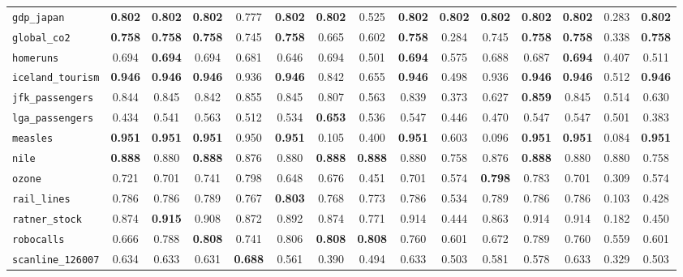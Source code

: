 \begin{tabular}{lcccccccccccccc}
\verb+gdp_japan+ & \textbf{0.802} & \textbf{0.802} & \textbf{0.802} & 0.777 & \textbf{0.802} & \textbf{0.802} & 0.525 & \textbf{0.802} & \textbf{0.802} & \textbf{0.802} & \textbf{0.802} & \textbf{0.802} & 0.283 & \textbf{0.802}\\
\verb+global_co2+ & \textbf{0.758} & \textbf{0.758} & \textbf{0.758} & 0.745 & \textbf{0.758} & 0.665 & 0.602 & \textbf{0.758} & 0.284 & 0.745 & \textbf{0.758} & \textbf{0.758} & 0.338 & \textbf{0.758}\\
\verb+homeruns+ & 0.694 & \textbf{0.694} & 0.694 & 0.681 & 0.646 & 0.694 & 0.501 & \textbf{0.694} & 0.575 & 0.688 & 0.687 & \textbf{0.694} & 0.407 & 0.511\\
\verb+iceland_tourism+ & \textbf{0.946} & \textbf{0.946} & \textbf{0.946} & 0.936 & \textbf{0.946} & 0.842 & 0.655 & \textbf{0.946} & 0.498 & 0.936 & \textbf{0.946} & \textbf{0.946} & 0.512 & \textbf{0.946}\\
\verb+jfk_passengers+ & 0.844 & 0.845 & 0.842 & 0.855 & 0.845 & 0.807 & 0.563 & 0.839 & 0.373 & 0.627 & \textbf{0.859} & 0.845 & 0.514 & 0.630\\
\verb+lga_passengers+ & 0.434 & 0.541 & 0.563 & 0.512 & 0.534 & \textbf{0.653} & 0.536 & 0.547 & 0.446 & 0.470 & 0.547 & 0.547 & 0.501 & 0.383\\
\verb+measles+ & \textbf{0.951} & \textbf{0.951} & \textbf{0.951} & 0.950 & \textbf{0.951} & 0.105 & 0.400 & \textbf{0.951} & 0.603 & 0.096 & \textbf{0.951} & \textbf{0.951} & 0.084 & \textbf{0.951}\\
\verb+nile+ & \textbf{0.888} & 0.880 & \textbf{0.888} & 0.876 & 0.880 & \textbf{0.888} & \textbf{0.888} & 0.880 & 0.758 & 0.876 & \textbf{0.888} & 0.880 & 0.880 & 0.758\\
\verb+ozone+ & 0.721 & 0.701 & 0.741 & 0.798 & 0.648 & 0.676 & 0.451 & 0.701 & 0.574 & \textbf{0.798} & 0.783 & 0.701 & 0.309 & 0.574\\
\verb+rail_lines+ & 0.786 & 0.786 & 0.789 & 0.767 & \textbf{0.803} & 0.768 & 0.773 & 0.786 & 0.534 & 0.789 & 0.786 & 0.786 & 0.103 & 0.428\\
\verb+ratner_stock+ & 0.874 & \textbf{0.915} & 0.908 & 0.872 & 0.892 & 0.874 & 0.771 & 0.914 & 0.444 & 0.863 & 0.914 & 0.914 & 0.182 & 0.450\\
\verb+robocalls+ & 0.666 & 0.788 & \textbf{0.808} & 0.741 & 0.806 & \textbf{0.808} & \textbf{0.808} & 0.760 & 0.601 & 0.672 & 0.789 & 0.760 & 0.559 & 0.601\\
\verb+scanline_126007+ & 0.634 & 0.633 & 0.631 & \textbf{0.688} & 0.561 & 0.390 & 0.494 & 0.633 & 0.503 & 0.581 & 0.578 & 0.633 & 0.329 & 0.503\\

\end{tabular}
